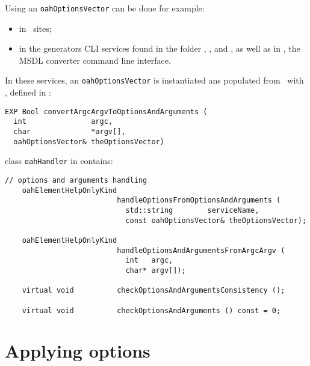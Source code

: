 Using an {\tt oahOptionsVector} can be done for example:
\begin{itemize}
\item in \Web\ sites; %
\item in the generators CLI services found in the \clisamples{} folder , ,  and , as well as in , the MSDL converter command line interface.
\end{itemize}

 In these services, an {\tt oahOptionsVector} is instantiated ans populated from \argcargv\ with , defined in :%
\begin{lstlisting}[language=CPlusPlus]
EXP Bool convertArgcArgvToOptionsAndArguments (
  int               argc,
  char              *argv[],
  oahOptionsVector& theOptionsVector)
\end{lstlisting}

class   {\tt oahHandler} in  contains:
\begin{lstlisting}[language=CPlusPlus]
    // options and arguments handling
    oahElementHelpOnlyKind
                          handleOptionsFromOptionsAndArguments (
                            std::string        serviceName,
                            const oahOptionsVector& theOptionsVector);

    oahElementHelpOnlyKind
                          handleOptionsAndArgumentsFromArgcArgv (
                            int   argc,
                            char* argv[]);

    virtual void          checkOptionsAndArgumentsConsistency ();

    virtual void          checkOptionsAndArguments () const = 0;
\end{lstlisting}


\section{Applying options}

